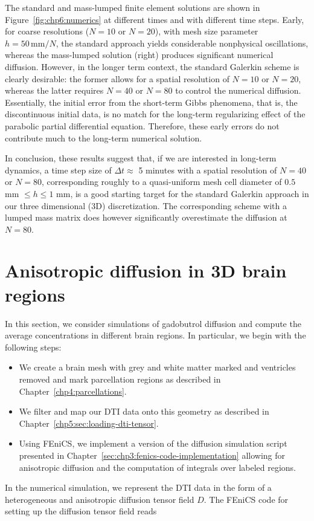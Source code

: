 The standard and mass-lumped finite element solutions are shown in
Figure~\ref{fig:chp6:numerics} at different times and with different
time steps. Early, for coarse resolutions ($N = 10$ or $N=20$), with mesh size parameter $h=50 \, \mbox{mm}/N$,  the
standard approach yields considerable nonphysical oscillations, whereas 
the mass-lumped solution (right) produces significant numerical
diffusion. However, in the longer term context, the standard Galerkin
scheme is clearly desirable: the former allows for a spatial
resolution of $N=10$ or $N=20$, whereas the latter requires $N=40$ or
$N=80$ to control the numerical diffusion. Essentially, the initial
error from the short-term Gibbs phenomena, that is, the discontinuous
initial data, is no match for the long-term regularizing effect of the
parabolic partial differential equation. Therefore, these early errors do not contribute much to the
long-term numerical solution.

In conclusion, these results suggest that, if we are interested in
long-term dynamics, a time step size of $\Delta t \approx$ 5 minutes with
a spatial resolution of $N=40$ or $N=80$, corresponding roughly to a
quasi-uniform mesh cell diameter of $0.5$ mm $\leq h \leq 1$ mm, is
a good starting target for the standard Galerkin approach in our three dimensional 
(3D) discretization. The corresponding scheme with a lumped mass matrix does however
significantly overestimate the diffusion at $N=80$. 

\section{Anisotropic diffusion in 3D brain regions}

In this section, we consider simulations of gadobutrol diffusion 
and compute the average concentrations in different brain regions. In
particular, we begin with the following steps:
\begin{itemize}
\item
  We create a brain mesh with grey and white matter marked and
  ventricles removed and mark parcellation regions as described in
  Chapter~\ref{chp4:parcellations}. 
\item
  We filter and map our DTI data onto this geometry as described in 
  Chapter~\ref{chp5:sec:loading-dti-tensor}.
\item
  Using FEniCS, we implement a version of the diffusion simulation
  script presented in
  Chapter~\ref{sec:chp3:fenics-code-implementation} allowing for
  anisotropic diffusion and the computation of integrals over labeled
  regions.
\end{itemize}
In the numerical simulation, we represent the DTI data in the form of
a heterogeneous and anisotropic diffusion tensor field $D$. The FEniCS
code for setting up the diffusion tensor field reads 

